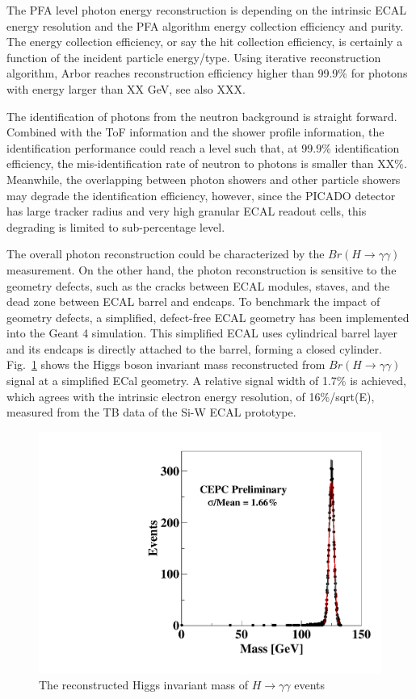The PFA level photon energy reconstruction is depending on the intrinsic ECAL energy resolution
and the PFA algorithm energy collection efficiency and purity.
The energy collection efficiency, or say the hit collection efficiency, is certainly a function of the incident particle energy/type.
Using iterative reconstruction algorithm, Arbor reaches reconstruction efficiency higher than 99.9\%
for photons with energy larger than XX GeV, see also XXX. 

The identification of photons from the neutron background is straight forward.
Combined with the ToF information and the shower profile information,
the identification performance could reach a level such that, at 99.9\% identification efficiency,
the mis-identification rate of neutron to photons is smaller than XX\%.
Meanwhile, the overlapping between photon showers and other particle showers may degrade the identification efficiency,
however, since the PICADO detector has large tracker radius and very high granular ECAL readout cells,
this degrading is limited to sub-percentage level. 

The overall photon reconstruction could be characterized by the $Br(H \to \gamma \gamma)$ measurement.
On the other hand, the photon reconstruction is sensitive to the geometry defects, such as the cracks between ECAL modules,
staves, and the dead zone between ECAL barrel and endcaps.
To benchmark the impact of geometry defects, a simplified,
defect-free ECAL geometry has been implemented into the Geant 4 simulation.
This simplified ECAL uses cylindrical barrel layer and its endcaps is directly attached to the barrel, forming a closed cylinder. 
Fig.~\ref{fig:performance-diphoton} shows the Higgs boson invariant mass reconstructed from $Br(H \to \gamma \gamma)$ signal at a simplified ECal geometry.
A relative signal width of 1.7\% is achieved, which agrees with the intrinsic electron energy resolution,
of 16\%/sqrt(E), measured from the TB data of the Si-W ECAL prototype. 
%
\begin{figure}[h!]
\centering
\includegraphics[scale=0.32]{Figures/Performance/zhaohang/h_gammagamma}
\caption{The reconstructed Higgs invariant mass of $H \to \gamma \gamma$ events  }
\label{fig:performance-diphoton}
\end{figure}



